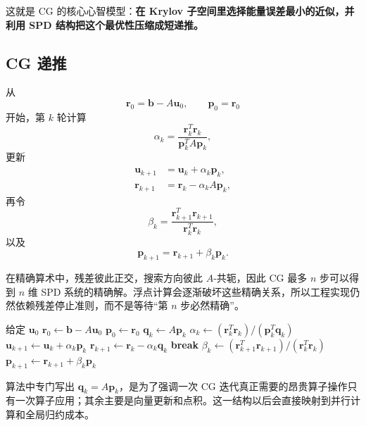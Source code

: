 这就是 CG 的核心心智模型：\textbf{在 Krylov 子空间里选择能量误差最小的近似，并利用 SPD 结构把这个最优性压缩成短递推。}

\subsection{CG 递推}

从
\begin{equation}
\bm r_0
=
\bm b-A\bm u_0,
\qquad
\bm p_0=\bm r_0
\end{equation}
开始，第 $k$ 轮计算
\begin{equation}
\alpha_k
=
\frac{\bm r_k^T\bm r_k}{\bm p_k^TA\bm p_k},
\label{eq:cg-alpha}
\end{equation}
更新
\begin{align}
\bm u_{k+1}
&=
\bm u_k+\alpha_k\bm p_k,
\\
\bm r_{k+1}
&=
\bm r_k-\alpha_kA\bm p_k,
\end{align}
再令
\begin{equation}
\beta_k
=
\frac{\bm r_{k+1}^T\bm r_{k+1}}{\bm r_k^T\bm r_k},
\label{eq:cg-beta}
\end{equation}
以及
\begin{equation}
\bm p_{k+1}
=
\bm r_{k+1}+\beta_k\bm p_k.
\label{eq:cg-direction}
\end{equation}

在精确算术中，残差彼此正交，搜索方向彼此 $A$-共轭，因此 CG 最多 $n$ 步可以得到 $n$ 维 SPD 系统的精确解。浮点计算会逐渐破坏这些精确关系，所以工程实现仍然依赖残差停止准则，而不是等待“第 $n$ 步必然精确”。

\begin{algorithm}[htbp]
\caption{共轭梯度法（CG）}
\begin{algorithmic}[1]
\State 给定 $\bm u_0$
\State $\bm r_0\gets\bm b-A\bm u_0$
\State $\bm p_0\gets\bm r_0$
  \State $\bm q_k\gets A\bm p_k$
  \State $\alpha_k\gets(\bm r_k^T\bm r_k)/(\bm p_k^T\bm q_k)$
  \State $\bm u_{k+1}\gets\bm u_k+\alpha_k\bm p_k$
  \State $\bm r_{k+1}\gets\bm r_k-\alpha_k\bm q_k$
    \State \textbf{break}
  \EndIf
  \State $\beta_k\gets(\bm r_{k+1}^T\bm r_{k+1})/(\bm r_k^T\bm r_k)$
  \State $\bm p_{k+1}\gets\bm r_{k+1}+\beta_k\bm p_k$
\EndFor
\end{algorithmic}
\end{algorithm}

算法中专门写出 $\bm q_k=A\bm p_k$，是为了强调一次 CG 迭代真正需要的昂贵算子操作只有一次算子应用；其余主要是向量更新和点积。这一结构以后会直接映射到并行计算和全局归约成本。

